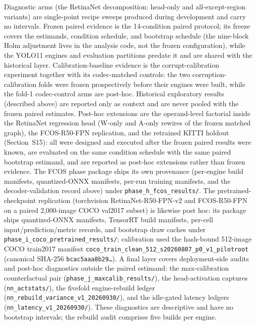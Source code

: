 \documentclass[10pt]{article}
\begin{document}
Diagnostic arms (the RetinaNet decomposition: head-only and
all-except-region variants) are single-point recipe sweeps produced during
development and carry no intervals. Frozen paired evidence is the
14-condition paired protocol; its freeze covers the estimands, condition
schedule, and bootstrap schedule (the nine-block Holm adjustment lives in
the analysis code, not the frozen configuration), while the YOLO11
engines and evaluation partitions predate it and are shared with the
historical layer. Calibration-baseline evidence is the corrupt-calibration
experiment together with its codec-matched controls: the two
corruption-calibration folds were frozen prospectively before their engines
were built, while the fold-1 codec-control arms are post-hoc. Historical exploratory
results (described above) are reported only as context and are never pooled
with the frozen paired estimates.
Post-hoc extensions are the operand-level factorial inside the RetinaNet
regression head (W-only and A-only rewires of the frozen matched graph), the
FCOS-R50-FPN replication, and the retrained KITTI holdout (Section~S15): all were designed and executed after the
frozen paired results were known, are evaluated on the same condition
schedule with the same paired bootstrap estimand, and are reported as
post-hoc extensions rather than frozen evidence. The FCOS phase package
ships its own provenance (per-engine build manifests, quantized-ONNX
manifests, per-run training manifests, and the decoder-validation record
above) under \texttt{phase\_h\_fcos\_results/}. The pretrained-checkpoint
replication (torchvision RetinaNet-R50-FPN-v2 and FCOS-R50-FPN on a paired
2,000-image COCO val2017 subset) is likewise post hoc: its package ships
quantized-ONNX manifests, TensorRT build manifests, per-cell input/prediction/metric
records, and bootstrap draw caches under
\texttt{phase\_i\_coco\_pretrained\_results/}; calibration used the
hash-bound 512-image COCO train2017 manifest
\texttt{coco\_train\_clean\_512\_s20260807\_p0\_v1\_pilotroot}
(canonical SHA-256 \texttt{bcac5aaa8b29\ldots}). A final layer covers
deployment-side audits and post-hoc diagnostics outside the paired
estimand: the max-calibration counterfactual pair
(\texttt{phase\_j\_maxcalib\_results/}), the head-activation captures
(\texttt{nn\_actstats/}), the fivefold engine-rebuild ledger
(\texttt{nn\_rebuild\_variance\_v1\_20260930/}), and the idle-gated
latency ledgers (\texttt{nn\_latency\_v1\_20260930/}). These diagnostics are descriptive and
have no bootstrap intervals; the rebuild audit comprises five builds per engine.
\end{document}
